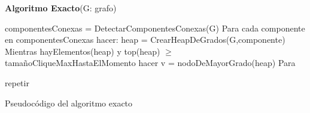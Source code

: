 \incmargin{1em}
\linesnumbered
{}

\textbf{Algoritmo Exacto}(G: grafo) \\
\begin{algorithm}[H]
	\BlankLine
		componentesConexas = DetectarComponentesConexas(G)
		Para cada componente en componentesConexas hacer:
			heap = CrearHeapDeGrados(G,componente)
			\BlankLine
			Mientras hayElementos(heap) y top(heap) $\geq$ tamañoCliqueMaxHastaElMomento
			hacer
				v = nodoDeMayorGrado(heap)
				Para 
	
	
			repetir
				
	\caption{Pseudocódigo del algoritmo exacto}
\end{algorithm}



\paragraph{}

